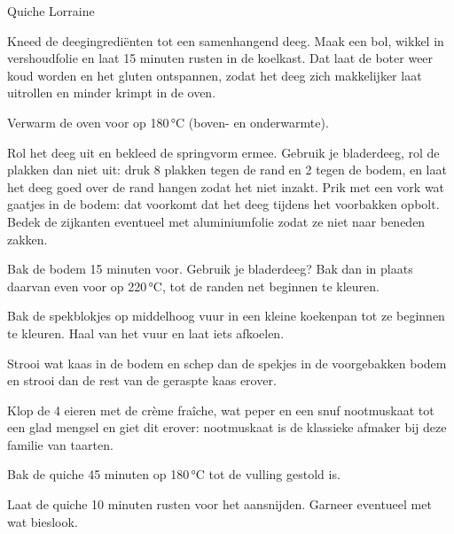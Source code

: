 \begin{recipe}{Quiche Lorraine}
\begin{steps}
  \item Kneed de deegingrediënten tot een samenhangend deeg. Maak een bol, wikkel
        in vershoudfolie en laat 15 minuten rusten in de koelkast. Dat laat de boter weer
        koud worden en het gluten ontspannen, zodat het deeg zich makkelijker laat
        uitrollen en minder krimpt in de oven.
  \item Verwarm de oven voor op 180\,°C (boven- en onderwarmte). 
  \item Rol het deeg uit en bekleed de springvorm ermee. Gebruik je
        bladerdeeg, rol de plakken dan niet uit: druk 8 plakken tegen de rand
        en 2 tegen de bodem, en laat het deeg goed over de rand hangen zodat
        het niet inzakt. Prik met een vork wat gaatjes in de bodem: dat
        voorkomt dat het deeg tijdens het voorbakken opbolt. Bedek de
        zijkanten eventueel met aluminiumfolie zodat ze niet naar beneden
        zakken.
  \item Bak de bodem 15 minuten voor. Gebruik je bladerdeeg? Bak dan in
        plaats daarvan even voor op 220\,°C, tot de randen net beginnen te
        kleuren.
  \item Bak de spekblokjes op middelhoog vuur in een kleine koekenpan tot ze beginnen te
        kleuren. Haal van het vuur en laat iets afkoelen.
  \item Strooi wat kaas in de bodem en schep dan de spekjes in de voorgebakken bodem en strooi
        dan de rest van de geraspte kaas erover.
  \item Klop de 4 eieren met de crème fraîche, wat peper en een snuf
        nootmuskaat tot een glad mengsel en giet dit erover: nootmuskaat
        is de klassieke afmaker bij deze familie van taarten.
  \item Bak de quiche 45 minuten op 180\,°C tot de vulling gestold is. 
  \item Laat de quiche 10 minuten rusten voor het aansnijden. Garneer eventueel met wat bieslook.
\end{steps}

\end{recipe}
